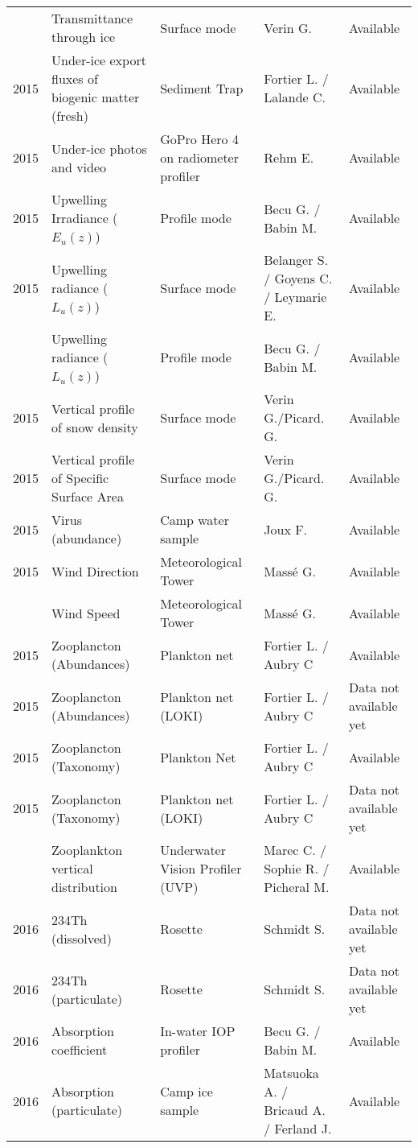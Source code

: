 \documentclass[]{article}
\begin{document}
\begin{landscape}
\begin{longtable}[t]{rllll}
\addlinespace
2015 & Transmittance through ice & Surface mode & Verin G. & Available\\
2015 & Under-ice export fluxes of biogenic matter (fresh) & Sediment Trap & Fortier L. / Lalande C. & Available\\
2015 & Under-ice photos and video & GoPro Hero 4 on radiometer profiler & Rehm E. & Available\\
2015 & Upwelling Irradiance ($E_u(z)$) & Profile mode & Becu G. / Babin M. & Available\\
2015 & Upwelling radiance ($L_u(z)$) & Surface mode & Belanger S. / Goyens C. / Leymarie E. & Available\\
\addlinespace
2015 & Upwelling radiance ($L_u(z)$) & Profile mode & Becu G. / Babin M. & Available\\
2015 & Vertical profile of snow density & Surface mode & Verin G./Picard. G. & Available\\
2015 & Vertical profile of Specific Surface Area & Surface mode & Verin G./Picard. G. & Available\\
2015 & Virus (abundance) & Camp water sample & Joux F. & Available\\
2015 & Wind Direction & Meteorological Tower & Massé G. & Available\\
\addlinespace
2015 & Wind Speed & Meteorological Tower & Massé G. & Available\\
2015 & Zooplancton (Abundances) & Plankton net & Fortier L. / Aubry C & Available\\
2015 & Zooplancton (Abundances) & Plankton net (LOKI) & Fortier L. / Aubry C & Data not available yet\\
2015 & Zooplancton (Taxonomy) & Plankton Net & Fortier L. / Aubry C & Available\\
2015 & Zooplancton (Taxonomy) & Plankton net (LOKI) & Fortier L. / Aubry C & Data not available yet\\
\addlinespace
2015 & Zooplankton vertical distribution & Underwater Vision Profiler (UVP) & Marec C. / Sophie R. / Picheral M. & Available\\
2016 & 234Th (dissolved) & Rosette & Schmidt S. & Data not available yet\\
2016 & 234Th (particulate) & Rosette & Schmidt S. & Data not available yet\\
2016 & Absorption coefficient & In-water IOP profiler & Becu G. / Babin M. & Available\\
2016 & Absorption (particulate) & Camp ice sample & Matsuoka A. / Bricaud A. / Ferland J. & Available\\

\end{longtable}
\end{landscape}
\end{document}
